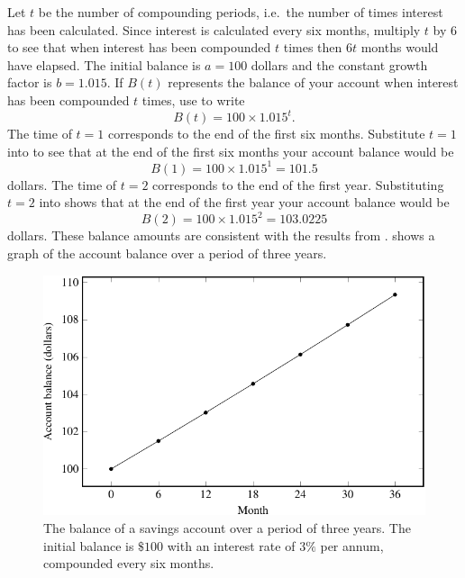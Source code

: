 \documentclass[a4paper,oneside,12pt]{article}
\begin{document}
\begin{solution}
Let $t$ be the number of compounding periods, i.e.~the number of times
interest has been calculated.  Since interest is calculated every six
months, multiply $t$ by $6$ to see that when interest has been
compounded $t$ times then $6t$ months would have elapsed.  The initial
balance is $a = 100$ dollars and the constant growth factor is
$b = 1.015$.  If $B(t)$ represents the balance of your account when
interest has been compounded $t$ times, use
 to write
\begin{equation}
\label{eqn:compound_interest_a100_b1.015}
B(t)
=
100 \times 1.015^t.
\end{equation}
The time of $t = 1$ corresponds to the end of the first six months.
Substitute $t = 1$ into 
to see that at the end of the first six months your account balance
would be
\[
B(1)
=
100 \times 1.015^1
=
101.5
\]
dollars.  The time of $t = 2$ corresponds to the end of the first
year.  Substituting $t = 2$ into
 shows that at the end of
the first year your account balance would be
\[
B(2)
=
100 \times 1.015^2
=
103.0225
\]
dollars.  These balance amounts are consistent with the results
from .
 shows a graph of the
account balance over a period of three years.

\begin{figure}[!htbp]
\centering
\includegraphics[scale=1.1]{image/11/interest-half-yearly.pdf}
\caption{%
  The balance of a savings account over a period of three years.  The
  initial balance is $\$100$ with an interest rate of $3\%$ per annum,
  compounded every six months.
}
\label{fig:compound_interest_a100_b1.015}
\end{figure}


\end{solution}
\end{document}
